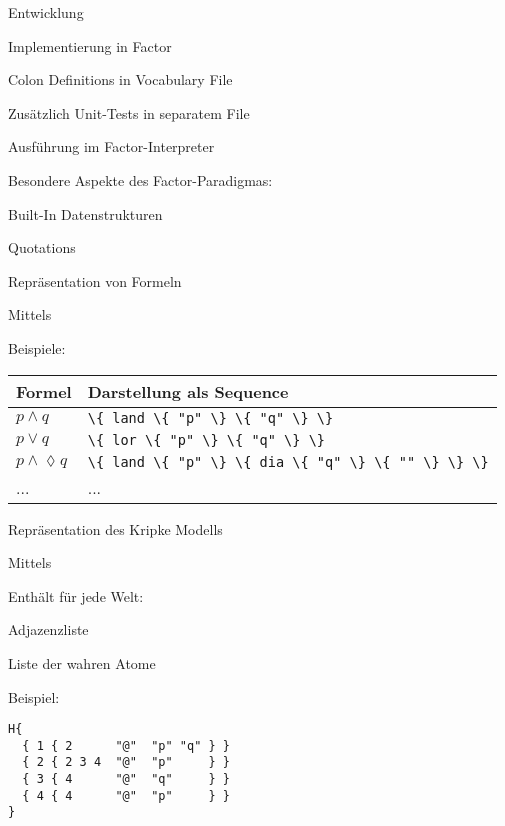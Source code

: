 \begin{frame}{Entwicklung}
\bi
  \item Implementierung in Factor
  \item Colon Definitions in Vocabulary File
  \item Zus\"atzlich Unit-Tests in separatem File
  \item Ausf\"uhrung im Factor-Interpreter
  \item Besondere Aspekte des Factor-Paradigmas:
  \bi
    \item Built-In Datenstrukturen
    \item Quotations
  \ei
\ei
\end{frame}

\begin{frame}{Repr\"asentation von Formeln}
\bi
  \item Mittels 
  \item Beispiele:
\ei

\begin{center}
\begin{tabular}{l|l}
Formel & Darstellung als Sequence \\
\hline
$p \wedge q$ & \lstinline!\{ land \{ "p" \} \{ "q" \} \}! \\
$p \vee q$ & \lstinline!\{ lor \{ "p" \} \{ "q" \} \}! \\
$p \wedge \lozenge q$ & \lstinline!\{ land \{ "p" \} \{ dia \{ "q" \} \{ "" \} \} \}! \\
... & ...
\end{tabular}
\end{center}
\end{frame}

\begin{frame}[fragile]{Repr\"asentation des Kripke Modells}
\bi
  \item Mittels 
  \item Enth\"alt f\"ur jede Welt:
  \bi
    \item Adjazenzliste
    \item Liste der wahren Atome
  \ei
  \item Beispiel:
\ei

\begin{lstlisting}[xleftmargin=50pt]
H{
  { 1 { 2      "@"  "p" "q" } }
  { 2 { 2 3 4  "@"  "p"     } }
  { 3 { 4      "@"  "q"     } }
  { 4 { 4      "@"  "p"     } }
}
\end{lstlisting}
\end{frame}

\begin{frame}[c,allowframebreaks]
\begin{center}
\Huge
{}
\end{center}
\end{frame}